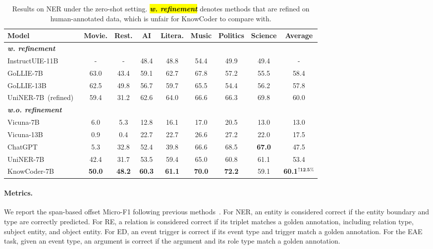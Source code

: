 \begin{table*}
  \centering
  \resizebox{1\linewidth}{!}
  {\begin{tabular}{@{}lcccccccc}
  \toprule
  \textbf{Model} &
  \textbf{Movie.} &
  \textbf{Rest.} &
  \textbf{AI} &
  \textbf{Litera.} &
  \textbf{Music} &
  \textbf{Politics} &
  \textbf{Science} &
  \textbf{Average} \\ 
  \midrule
  \textit{\textbf{w. refinement}} \\
  \rowcolor{softblue} InstructUIE-11B~\cite{wang2023instructuie} & - & - & 48.4 & 48.8 & 54.4 & 49.9 & 49.4 & -  \\
  \rowcolor{softblue} GoLLIE-7B~\cite{sainz2023gollie} & 63.0  & 43.4 & 59.1 & 62.7 & 67.8 & 57.2  & 55.5 & 58.4 \\
  \rowcolor{softblue} GoLLIE-13B~\cite{sainz2023gollie} & 62.5  & 49.8 & 56.7 & 59.7 & 65.5 & 54.4  & 56.2 & 57.8 \\
  \rowcolor{softblue} UniNER-7B~(refined)~\cite{zhou2023universalner} &  59.4 & 31.2 & 62.6 & 64.0 & 66.6 & 66.3 & 69.8 & 60.0 \\
  \midrule
  \textit{\textbf{w.o. refinement}} \\
  Vicuna-7B~\cite{chiang2023vicuna}  & 6.0 & 5.3 & 12.8 & 16.1 & 17.0 & 20.5 & 13.0 & 13.0  \\
  Vicuna-13B~\cite{chiang2023vicuna}  & 0.9 & 0.4 & 22.7 & 22.7 & 26.6 & 27.2 & 22.0 & 17.5  \\
  ChatGPT~\cite{ouyang2022training}  & 5.3 & 32.8 & 52.4 & 39.8 & 66.6 & 68.5 & \textbf{67.0} & 47.5  \\
  UniNER-7B~\cite{zhou2023universalner}  & 42.4 & 31.7 & 53.5 & 59.4 & 65.0 & 60.8 & 61.1 &53.4\\
  \rowcolor{softyellow} KnowCoder-7B   & \textbf{50.0} & \textbf{48.2} & \textbf{60.3} & \textbf{61.1} & \textbf{70.0} & \textbf{72.2} & 59.1 & \textbf{60.1}$^{\uparrow\textbf{12.5\%}}$\\
  \bottomrule
  \end{tabular}}
  \caption{Results on NER under the zero-shot setting. \hl{\textit{\textbf{w. refinement}}} denotes methods that are refined on human-annotated data, which is unfair for KnowCoder to compare with.}
  \label{tab:zeroshot-ner-results-table}
  \vspace{-4mm}
  \end{table*}

\paragraph{Metrics.}
We report the span-based offset Micro-F1 following previous methods~\cite{lu-etal-2022-unified, lin-etal-2020-joint}. For NER, an entity is considered correct if the entity boundary and type are correctly predicted. For RE, a relation is considered correct if its triplet matches a golden annotation, including relation type, subject entity, and object entity. For ED, an event trigger is correct if its event type and trigger match a golden annotation. For the EAE task, given an event type, an argument is correct if the argument and its role type match a golden annotation. 

